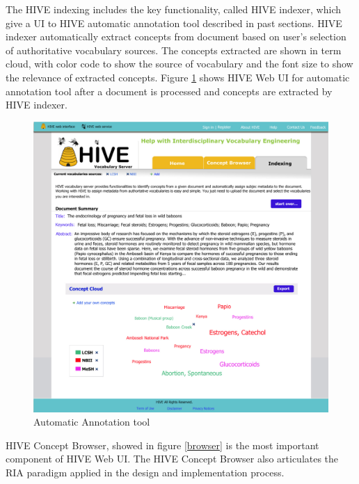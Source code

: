 The HIVE indexing includes the key functionality, called HIVE indexer, which give a UI to HIVE automatic 
annotation tool described in past sections. HIVE indexer automatically extract concepts from document based 
on user's selection of authoritative vocabulary sources. 
The concepts extracted are shown in term cloud, with color code to show the source of vocabulary 
and the font size to show the relevance of extracted concepts. 
Figure \ref{indexing} shows HIVE Web UI for 
automatic annotation tool after a document is processed and concepts are extracted by HIVE indexer.

\begin{figure}
\centering
\includegraphics[width=400pt]{img/indexing.pdf}
\caption{Automatic Annotation tool}
\label{indexing}
\end{figure}

HIVE Concept Browser, showed in figure \ref{browser} is the most important component of HIVE Web UI. The HIVE Concept Browser also 
articulates the RIA paradigm applied in the design and implementation process.

